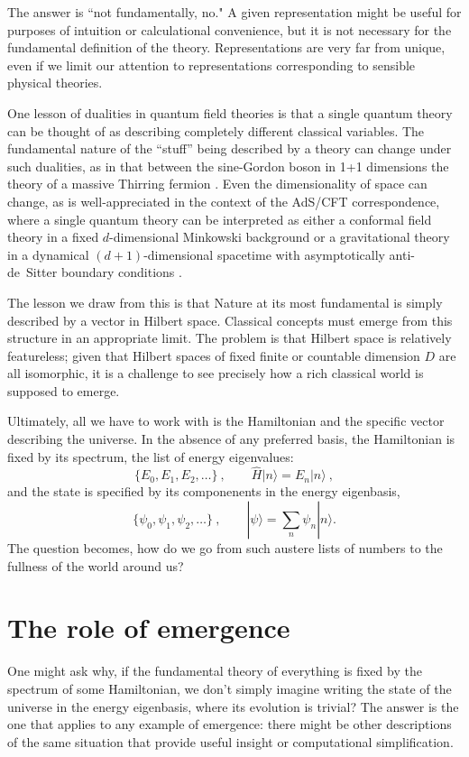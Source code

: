 \documentclass[12pt,english]{article}
\newcommand{\be}{\begin{equation}}
\newcommand{\ee}{\end{equation}}
\begin{document}
The answer is ``not fundamentally, no."
A given representation might be useful for purposes of intuition or calculational convenience, but it is not necessary for the fundamental definition of the theory.
Representations are very far from unique, even if we limit our attention to representations corresponding to sensible physical theories.

One lesson of dualities in quantum field theories is that a single quantum theory can be thought of as describing completely different classical variables.
The fundamental nature of the ``stuff'' being described by a theory can change under such dualities, as in that between the sine-Gordon boson in 1+1 dimensions the theory of a massive Thirring fermion \cite{PhysRevD.11.2088}.
Even the dimensionality of space can change, as is well-appreciated in the context of the AdS/CFT correspondence, where a single quantum theory can be interpreted as either a conformal field theory in a fixed $d$-dimensional Minkowski background or a gravitational theory in a dynamical $(d+1)$-dimensional spacetime with asymptotically anti-de~Sitter boundary conditions \cite{Maldacena:1997re}.

The lesson we draw from this is that Nature at its most fundamental is simply described by a vector in Hilbert space.
Classical concepts must emerge from this structure in an appropriate limit.
The problem is that Hilbert space is relatively featureless; given that Hilbert spaces of fixed finite or countable dimension $D$ are all isomorphic, it is a challenge to see precisely how a rich classical world is supposed to emerge.

Ultimately, all we have to work with is the Hamiltonian and the specific vector describing the universe.
In the absence of any preferred basis, the Hamiltonian is fixed by its spectrum, the list of energy eigenvalues:
\be
  \{E_0, E_1, E_2, \ldots\}\ , \qquad \hat{H}|n\rangle = E_n|n\rangle\ ,
\ee
and the state is specified by its componenents in the energy eigenbasis,
\be
  \{\psi_0, \psi_1, \psi_2, \ldots\}\ ,\qquad |\psi\rangle = \sum_n \psi_n|n\rangle.
\ee
The question becomes, how do we go from such austere lists of numbers to the fullness of the world around us?

\section{The role of emergence}

One might ask why, if the fundamental theory of everything is fixed by the spectrum of some Hamiltonian, we don't simply imagine writing the state of the universe in the energy eigenbasis, where its evolution is trivial?
The answer is the one that applies to any example of emergence: there might be other descriptions of the same situation that provide useful insight or computational simplification.
\end{document}
